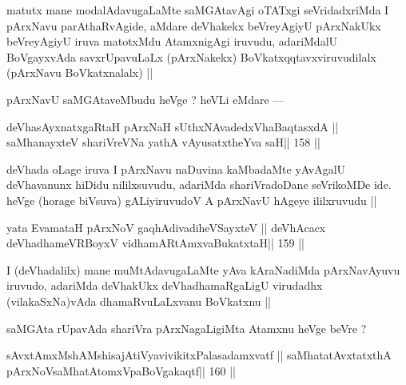 \begin{artha}
matutx mane modalAdavugaLaMte saMGAtavAgi oTATxgi seVridadxriMda I pArxNavu parAthaRvAgide, aMdare deVhakekx beVreyAgiyU pArxNakUkx beVreyAgiyU iruva matotxMdu AtamxnigAgi iruvudu, adariMdalU BoVgayxvAda savxrUpavuLaLx (pArxNakekx) BoVkatxqqtavxviruvudilalx (pArxNavu BoVkatxnalalx) ||
\end{artha}

\begin{artha}
pArxNavU saMGAtaveMbudu heVge ? heVLi eMdare ---
\end{artha}

\begin{shl}
deVhasAyxnatxgaRtaH pArxNaH sUthxNAvadedxVhaBaqtasxdA ||
saMhanayxteV shariVreVNa yathA vAyusatxtheYva saH\hfill || 158 ||
\end{shl}

\begin{artha}
deVhada oLage iruva I pArxNavu naDuvina kaMbadaMte yAvAgalU deVhavanunx hiDidu nililxsuvudu, adariMda shariVradoDane seVrikoMDe ide. heVge (horage biVsuva) gALiyiruvudoV A pArxNavU hAgeye ililxruvudu ||
\end{artha}

\begin{shl}
yata EvamataH pArxNoV gaqhAdivadiheVSayxteV ||
deVhAcacx deVhadhameVRBoyxV vidhamARtAmx\s vaBukatxtaH\hfill || 159 ||
\end{shl}

\begin{artha}
I (deVhadalilx) mane muMtAdavugaLaMte yAva kAraNadiMda pArxNavAyuvu iruvudo, adariMda deVhakUkx deVhadhamaRgaLigU virudadhx (vilakaSxNa)vAda dhamaRvuLaLxvanu BoVkatxnu ||
\end{artha}

\begin{artha}
saMGAta rUpavAda shariVra pArxNagaLigiMta Atamxnu heVge beVre ?
\end{artha}

\begin{shl}
sAvxtAmxMshAMshisajAtiVyavivikitxPalasadamxvatf ||
saMhatatAvxtatxthA pArxNoV\s saMhatAtomxVpaBoVgakaqtf\hfill || 160 ||
\end{shl}

